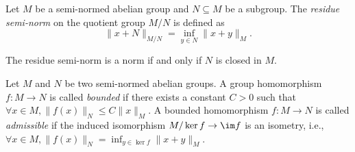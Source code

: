     \begin{definition}\label{def:residue_semi-norm}
        Let \(M\) be a semi-normed abelian group and \(N \subseteq M\) be a subgroup.
        The \emph{residue semi-norm} on the quotient group \(M/N\) is defined as
        \[
            \|x + N\|_{M/N} = \inf_{y \in N} \|x + y\|_M.
        \]
    \end{definition}

    \begin{remark}\label{rmk:residue_semi-norm}
        The residue semi-norm is a norm if and only if \(N\) is closed in \(M\).
    \end{remark}

    \begin{definition}\label{def:bounded_and_admissible_homomorphism}
        Let \(M\) and \(N\) be two semi-normed abelian groups.
        A group homomorphism \(f: M \to N\) is called \emph{bounded} if there exists a constant \(C > 0\) such that \(\forall x \in M, \|f(x)\|_N \leq C\|x\|_M\).
        A bounded homomorphism \(f: M \to N\) is called \emph{admissible} if the induced isomorphism \(M/\ker f \to \im f\) is an isometry, i.e., \(\forall x \in M, \|f(x)\|_N = \inf_{y \in \ker f} \|x + y\|_M\).
    \end{definition}

